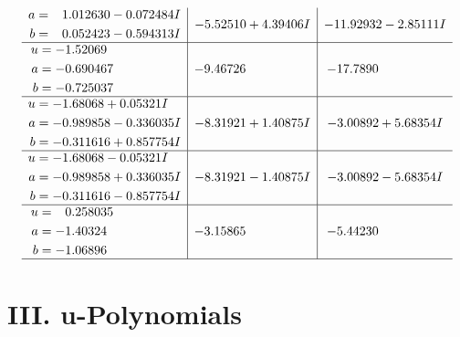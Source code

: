 \documentclass[1p]{elsarticle_modified}
\theoremstyle{definition}
\begin{document}
$$\begin{array}{c|c|c}
\begin{aligned}
a &= \phantom{-}1.012630 - 0.072484 I \\
b &= \phantom{-}0.052423 - 0.594313 I\end{aligned}
 & -5.52510 + 4.39406 I & -11.92932 - 2.85111 I \\ \hline\begin{aligned}
u &= -1.52069\phantom{ +0.000000I} \\
a &= -0.690467\phantom{ +0.000000I} \\
b &= -0.725037\phantom{ +0.000000I}\end{aligned}
 & -9.46726\phantom{ +0.000000I} & -17.7890\phantom{ +0.000000I} \\ \hline\begin{aligned}
u &= -1.68068 + 0.05321 I \\
a &= -0.989858 - 0.336035 I \\
b &= -0.311616 + 0.857754 I\end{aligned}
 & -8.31921 + 1.40875 I & -3.00892 + 5.68354 I \\ \hline\begin{aligned}
u &= -1.68068 - 0.05321 I \\
a &= -0.989858 + 0.336035 I \\
b &= -0.311616 - 0.857754 I\end{aligned}
 & -8.31921 - 1.40875 I & -3.00892 - 5.68354 I \\ \hline\begin{aligned}
u &= \phantom{-}0.258035\phantom{ +0.000000I} \\
a &= -1.40324\phantom{ +0.000000I} \\
b &= -1.06896\phantom{ +0.000000I}\end{aligned}
 & -3.15865\phantom{ +0.000000I} & -5.44230\phantom{ +0.000000I}\\
 \hline 
 \end{array}$$\newpage
\newpage\renewcommand{\arraystretch}{1}
\centering \section*{ III. u-Polynomials}
\end{document}
